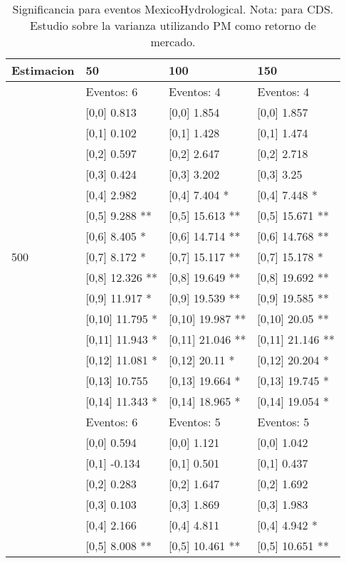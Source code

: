 \begin{table}

\caption{Significancia para eventos MexicoHydrological. Nota: para CDS. Estudio sobre la varianza utilizando PM como retorno de mercado.}
\centering
\begin{tabular}[t]{llll}
\toprule
Estimacion & 50 & 100 & 150\\
\midrule
 & Eventos:  6 & Eventos:  4 & Eventos:  4\\
 & {}[0,0] 0.813 & {}[0,0] 1.854 & {}[0,0] 1.857\\
 & {}[0,1] 0.102 & {}[0,1] 1.428 & {}[0,1] 1.474\\
 & {}[0,2] 0.597 & {}[0,2] 2.647 & {}[0,2] 2.718\\
 & {}[0,3] 0.424 & {}[0,3] 3.202 & {}[0,3] 3.25\\
\addlinespace
 & {}[0,4] 2.982 & {}[0,4] 7.404 * & {}[0,4] 7.448 *\\
 & {}[0,5] 9.288 ** & {}[0,5] 15.613 ** & {}[0,5] 15.671 **\\
 & {}[0,6] 8.405 * & {}[0,6] 14.714 ** & {}[0,6] 14.768 **\\
500 & {}[0,7] 8.172 * & {}[0,7] 15.117 ** & {}[0,7] 15.178 *\\
 & {}[0,8] 12.326 ** & {}[0,8] 19.649 ** & {}[0,8] 19.692 **\\
\addlinespace
 & {}[0,9] 11.917 * & {}[0,9] 19.539 ** & {}[0,9] 19.585 **\\
 & {}[0,10] 11.795 * & {}[0,10] 19.987 ** & {}[0,10] 20.05 **\\
 & {}[0,11] 11.943 * & {}[0,11] 21.046 ** & {}[0,11] 21.146 **\\
 & {}[0,12] 11.081 * & {}[0,12] 20.11 * & {}[0,12] 20.204 *\\
 & {}[0,13] 10.755 & {}[0,13] 19.664 * & {}[0,13] 19.745 *\\
\addlinespace
 & {}[0,14] 11.343 * & {}[0,14] 18.965 * & {}[0,14] 19.054 *\\
 & Eventos:  6 & Eventos:  5 & Eventos:  5\\
 & {}[0,0] 0.594 & {}[0,0] 1.121 & {}[0,0] 1.042\\
 & {}[0,1] -0.134 & {}[0,1] 0.501 & {}[0,1] 0.437\\
 & {}[0,2] 0.283 & {}[0,2] 1.647 & {}[0,2] 1.692\\
\addlinespace
 & {}[0,3] 0.103 & {}[0,3] 1.869 & {}[0,3] 1.983\\
 & {}[0,4] 2.166 & {}[0,4] 4.811 & {}[0,4] 4.942 *\\
 & {}[0,5] 8.008 ** & {}[0,5] 10.461 ** & {}[0,5] 10.651 **\\

\end{tabular}
\end{table}
